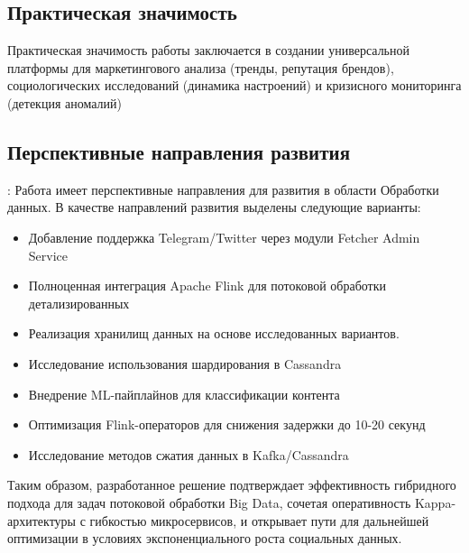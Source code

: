     \subsection{Практическая значимость} 
        Практическая значимость работы заключается в создании универсальной платформы для маркетингового анализа (тренды, репутация брендов), социологических исследований (динамика настроений) и кризисного мониторинга (детекция аномалий)

    \subsection{Перспективные направления развития}:
        Работа имеет перспективные направления для развития в области Обработки данных. В качестве направлений развития выделены следующие варианты:
        \begin{itemize}
            \item Добавление поддержка Telegram/Twitter через модули Fetcher Admin Service
            \item Полноценная интеграция Apache Flink для потоковой обработки детализированных
            \item Реализация хранилищ данных на основе исследованных вариантов.
            \item Исследование использования шардирования в Cassandra
            \item Внедрение ML-пайплайнов для классификации контента
            \item Оптимизация Flink-операторов для снижения задержки до 10-20 секунд
            \item Исследование методов сжатия данных в Kafka/Cassandra
        \end{itemize}

    Таким образом, разработанное решение подтверждает эффективность гибридного подхода для задач потоковой обработки Big Data, сочетая оперативность Kappa-архитектуры с гибкостью микросервисов, и открывает пути для дальнейшей оптимизации в условиях экспоненциального роста социальных данных.

\newpage
